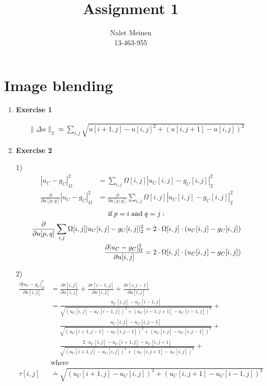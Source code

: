 \documentclass{paper}
\title{Assignment 1}
\author{Nalet Meinen\\13-463-955}
\newcommand{\equationinalign}[1]{%
  \multispan{2}%
  \hfill$\displaystyle{#1}$\hfill
  \ignorespaces
}
\begin{document}
\maketitle


%

\section*{Image blending}

\begin{enumerate}
\item \textbf{Exercise 1}

\begin{align*}
   \lVert \Delta u \rVert_2 \simeq \sum_{i,j} \sqrt{ u[i+1,j] - u[i,j]^2 + ( u[i,j + 1] - u[i,j] )^2 }
\end{align*}

\item \textbf{Exercise 2}

1)
\begin{align*}
   |u_C-g_C|^2_\Omega &= \sum_{i,j} \Omega[i,j] | u_C[i,j] - g_C[i,j] |^2_2 \\
   \frac{\partial}{\partial u[p,q]} |u_C-g_C|^2_\Omega &= \frac{\partial}{\partial u[p,q]} \sum_{i,j} \Omega[i,j] | u_C[i,j] - g_C[i,j] |^2_2
\end{align*}
\begin{align*}
   \equationinalign{\textrm{if} \; p = i \; \textrm{and} \; q = j \; \textrm{:}} \\
   \frac{\partial}{\partial u[p,q]} \sum_{i,j} \Omega[i,j] | u_C[i,j] - g_C[i,j] |^2_2 &= 2 \cdot \Omega[i,j] \cdot ( u_C[i,j] - g_C[i,j] ) \\
   \frac{\partial |u_C-g_C|^2_\Omega}{\partial u[i,j]} &= 2 \cdot \Omega[i,j] \cdot ( u_C[i,j] - g_C[i,j] )
\end{align*}

2)
\begin{align*}
   \frac{\partial |u_C-g_C|^2_\Omega}{\partial u[i,j]} &= \frac{\partial \tau[i,j]}{\partial u[i,j]} + \frac{\partial \tau[i - 1,j]}{\partial u[i,j]} + \frac{\partial \tau[i,j - 1]}{\partial u[i,j]} \\
   &= \frac{u_C[i,j] - u_C[i-1,j]}{\sqrt{(u_C[i,j] - u_C[i-1,j])^2 + (u_C[i-1,j+1] - u_C[i-1,j])^2}} + \\
   &\quad\; \frac{u_C[i,j] - u_C[i,j-1]}{\sqrt{(u_C[i+1,j-1] - u_C[i,j-1])^2 + (u_C[i,j] - u_C[i,j-1])^2}} + \\
   &\quad\; \frac{2 \cdot u_C[i,j] - u_C[i+1,j] - u_C[i,j+1]}{\sqrt{(u_C[i+1,j] - u_C[i,j])^2 + (u_C[i,j+1] - u_C[i,j])^2}} + \\
   & \textrm{where} \\
   \tau[i,j] &\doteq \sqrt{(u_C[i+1,j] - u_C[i,j])^2 + (u_C[i,j+1] - u_C[i-1,j])^2}
\end{align*}



\end{enumerate}
\end{document}
